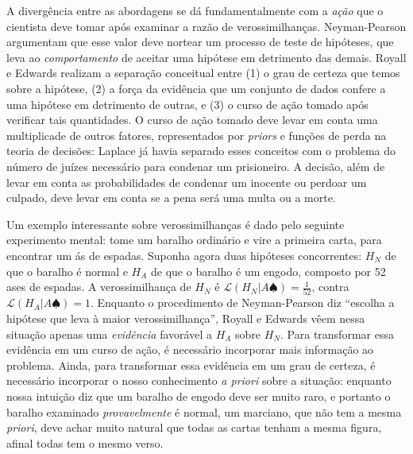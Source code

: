 A divergência entre as abordagens se dá fundamentalmente com a {\em ação} que o cientista deve tomar após examinar a 
razão de verossimilhanças. Neyman-Pearson argumentam que esse valor deve nortear um processo de teste de hipóteses, que
leva ao {\em comportamento} de aceitar uma hipótese em detrimento das demais. Royall e Edwards realizam a separação
conceitual entre (1) o grau de certeza que temos sobre a hipótese, (2) a força da evidência que um conjunto de dados confere
a uma hipótese em detrimento de outras, e (3) o curso de ação tomado após verificar tais quantidades. O curso de ação tomado
deve levar em conta uma multiplicade de outros fatores, representados por {\em priors} e funções de perda na teoria de 
decisões: Laplace já havia separado esses conceitos com o problema do 
número de juízes necessário para condenar um prisioneiro. A decisão, além de levar em conta as probabilidades de
condenar um inocente ou perdoar um culpado, deve levar em conta se a
pena será uma multa ou a morte.


Um exemplo interessante 
sobre verossimilhanças é dado 
pelo seguinte experimento mental: 
tome um baralho ordinário e vire a primeira carta,
para encontrar um ás de espadas. Suponha agora duas hipóteses concorrentes: $H_N$ de que o baralho é normal e $H_A$
de que o baralho é um engodo, composto por 52 ases de espadas. A verossimilhança de $H_N$ é 
$\mathcal{L} (H_N|A \spadesuit) = \frac{1}{52}$, contra $\mathcal{L} (H_A | A \spadesuit) = 1 $. Enquanto o procedimento
de Neyman-Pearson diz ``escolha a hipótese que leva à maior verossimilhança'', Royall e Edwards vêem nessa situação
apenas uma {\em evidência} favorável a $H_A$ sobre $H_N$. Para transformar essa evidência em um curso de ação, é necessário
incorporar mais informação ao problema. 
Ainda, para transformar essa evidência em um grau de certeza,
é necessário incorporar o nosso conhecimento {\em a priori} sobre a situação: enquanto nossa intuição diz
que um baralho de engodo deve ser muito raro, e portanto o baralho examinado {\em provavelmente} é normal, um marciano,
que não tem a mesma {\em priori}, deve achar muito natural que todas as cartas tenham a mesma figura, afinal todas tem o mesmo
verso. 

